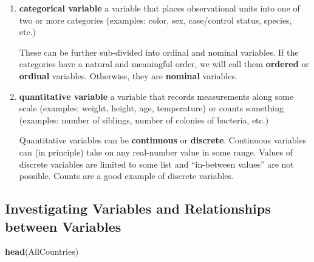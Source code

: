 \documentclass[]{book}
\newenvironment{Shaded}{\begin{snugshade}}{\end{snugshade}}
\newcommand{\KeywordTok}[1]{\textcolor[rgb]{0.13,0.29,0.53}{\textbf{#1}}}
\newcommand{\NormalTok}[1]{#1}
\begin{document}
\begin{enumerate}
\item
  \textbf{categorical variable} a variable that places observational units into one of two or more categories (examples: color, sex, case/control status, species, etc.)

  These can be further sub-divided into ordinal and nominal variables. If the categories have a natural and meaningful order, we will call them \textbf{ordered} or \textbf{ordinal} variables. Otherwise, they are \textbf{nominal} variables.
\item
  \textbf{quantitative variable} a variable that records measurements along some scale (examples: weight, height, age, temperature) or counts something (examples: number of siblings, number of colonies of bacteria, etc.)

  Quantitative variables can be \textbf{continuous} or \textbf{discrete}. Continuous variables can (in principle) take on any real-number value in some range. Values of discrete variables are limited to some list and ``in-between values'' are not possible. Counts are a good example of discrete variables.
\end{enumerate}

\hypertarget{investigating-variables-and-relationships-between-variables}{%
\subsection{Investigating Variables and Relationships between Variables}\label{investigating-variables-and-relationships-between-variables}}

\begin{Shaded}
\begin{Highlighting}[]
\KeywordTok{head}\NormalTok{(AllCountries)}
\end{Highlighting}
\end{Shaded}
\end{document}

